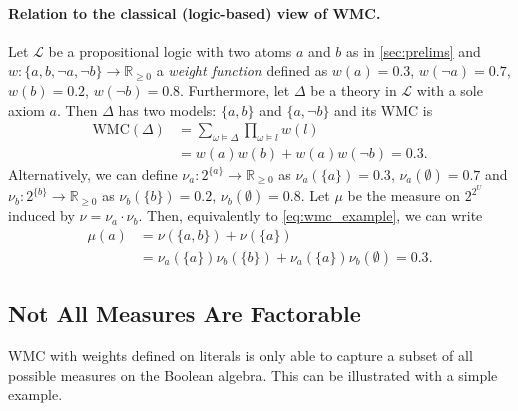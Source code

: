 \documentclass[letterpaper]{article} %
\theoremstyle{definition}
\theoremstyle{remark}
\begin{document}
{\paragraph{Relation to the classical (logic-based) view of WMC.} Let
$\mathcal{L}$ be a propositional logic with two atoms $a$ and $b$ as in
\cref{sec:prelims} and $w\colon \{ a, b, \neg a, \neg b \} \to \mathbb{R}_{\ge
  0}$ a \emph{weight function} defined as $w(a) = 0.3$, $w(\neg a) = 0.7$, $w(b)
= 0.2$, $w(\neg b) = 0.8$. Furthermore, let $\Delta$ be a theory in
$\mathcal{L}$ with a sole axiom $a$. Then $\Delta$ has two models: $\{ a, b \}$
and $\{ a, \neg b \}$ and its WMC \cite{DBLP:journals/ai/ChaviraD08} is
\begin{equation} \label{eq:wmc_example}
  \begin{split}
    \mathrm{WMC}(\Delta) &= \sum_{\omega \models \Delta} \prod_{\omega \models l} w(l) \\
    &= w(a)w(b) + w(a)w(\neg b) = 0.3.
  \end{split}
\end{equation}
Alternatively, we can define $\nu_a\colon 2^{\{a\}} \to \mathbb{R}_{\ge 0}$ as
$\nu_a(\{ a \}) = 0.3$, $\nu_a(\emptyset) = 0.7$ and $\nu_b\colon 2^{\{b\}} \to
\mathbb{R}_{\ge 0}$ as $\nu_b(\{ b \}) = 0.2$, $\nu_b(\emptyset) = 0.8$. Let
$\mu$ be the measure on $2^{2^U}$ induced by $\nu = \nu_a \cdot \nu_b$. Then,
equivalently to \cref{eq:wmc_example}, we can write
\begin{align*}
  \mu(a) &= \nu(\{ a, b \}) + \nu(\{ a \}) \\
         &= \nu_a(\{a\})\nu_b(\{b\}) + \nu_a(\{a\})\nu_b(\emptyset) = 0.3.
\end{align*}

\subsection{Not All Measures Are Factorable}

WMC with weights defined on literals is only able to capture a subset of all
possible measures on the Boolean algebra. This can be illustrated with a simple
example.

}
\end{document}
